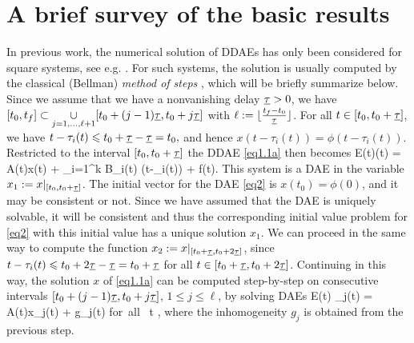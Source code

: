 \documentclass[final,reqno]{siamltex}
\begin{document}
\section{A brief survey of the basic results}
%
In previous work, the numerical solution of DDAEs has only been considered for square systems, see e.g.
\cite{AscP95,BakPT02,CamL09,GugH07,Liu99,ShaG06,TiaYK11,ZhuP97,ZhuP98}.
For such systems, the solution is usually computed by the classical (Bellman) \emph{method of steps} \cite{Bel61,BelC63,BelC65}, which will be briefly summarize below. Since we assume that we have a nonvanishing delay $\underline{\tau}>0$, we have $[t_0,t_f] \subset \underset{j=1,\dots,\ell+1}{\cup} [t_0+(j-1)\underline{\tau},t_0+j\underline{\tau}]$
with $\ell := \lfloor \frac{t_f-t_0}{\underline{\tau}} \rfloor$.
For all $t \in [t_0,t_0+\underline{\tau}]$, we have $t-\tau_i(t) \leqslant t_0 + \underline{\tau} - \underline{\tau} = t_0,$ and hence $x(t-\tau_i(t)) = \phi(t-\tau_i(t))$.
 Restricted to the interval $[t_0,t_0+\underline{\tau}]$ the DDAE \eqref{eq1.1a} then becomes
%
\be\label{eq2}
 E(t)(t) = A(t)x(t) + \sum_{i=1}^k B_i(t) \phi(t-\tau_i(t)) + f(t).
\ee
%
This system is a DAE in the variable $x_1 := x|_{[t_0,t_0+\underline{\tau}]}$. The initial vector for the DAE \eqref{eq2} is $x(t_0)=\phi(0)$, and it may be consistent or not. Since we have assumed that the DAE is uniquely solvable, it will be consistent and thus the corresponding initial value problem for \eqref{eq2} with this initial value has a unique solution $x_1$.  We can proceed in the same way to compute the function $x_2 := x|_{[t_0+\underline{\tau},t_0+2\underline{\tau}]}$, since $t-\tau_i(t) \leqslant t_0 + 2 \underline{\tau} - \underline{\tau} = t_0+\underline{\tau}$ for all $t\in [t_0+\underline{\tau},t_0+2\underline{\tau}]$. Continuing in this way, the solution $x$ of \eqref{eq1.1a} can be computed step-by-step on consecutive intervals $[t_0+(j-1)\underline{\tau},t_0+j\underline{\tau}]$, $1\leq j\leq \ell$, by solving DAEs
%
\be\label{eq3}
 E(t) _j(t) = A(t)x_j(t) + g_j(t) \quad \mbox{for all } t ,
\ee
%
where the inhomogeneity $g_j$ is obtained from the previous step.
\end{document}
